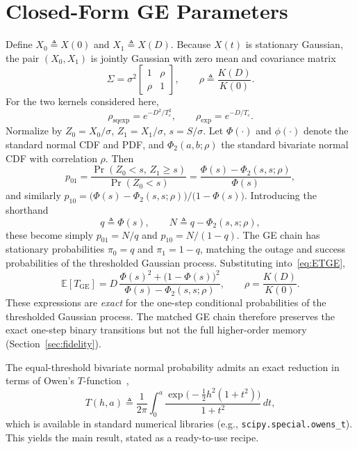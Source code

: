 \documentclass[conference]{IEEEtran}
\newcommand{\ETGE}{\mathbb{E}[T_{\mathrm{GE}}]}
\DeclareMathOperator{\Prob}{Pr}
\begin{document}
\section{Closed-Form GE Parameters}\label{sec:bridge}
Define $X_0\triangleq X(0)$ and $X_1\triangleq X(D)$. Because $X(t)$ is stationary Gaussian, the pair $(X_0,X_1)$ is jointly Gaussian with zero mean and covariance matrix
\begin{equation}\label{eq:sigma}
\Sigma=\sigma^2\begin{bmatrix}1&\rho\\ \rho&1\end{bmatrix},\qquad \rho\triangleq\frac{K(D)}{K(0)}.
\end{equation}
For the two kernels considered here,
\begin{equation}\label{eq:rho}
\rho_{\mathrm{sqexp}}=e^{-D^2/T_c^2},\qquad \rho_{\exp}=e^{-D/T_c}.
\end{equation}
Normalize by $Z_0=X_0/\sigma$, $Z_1=X_1/\sigma$, $s=S/\sigma$. Let $\Phi(\cdot)$ and $\phi(\cdot)$ denote the standard normal CDF and PDF, and $\Phi_2(a,b;\rho)$ the standard bivariate normal CDF with correlation $\rho$. Then
\begin{equation}\label{eq:p01gen}
p_{01}=\frac{\Prob(Z_0<s,\,Z_1\ge s)}{\Prob(Z_0<s)}=\frac{\Phi(s)-\Phi_2(s,s;\rho)}{\Phi(s)},
\end{equation}
and similarly $p_{10}=\big(\Phi(s)-\Phi_2(s,s;\rho)\big)/\big(1-\Phi(s)\big)$. Introducing the shorthand
\begin{equation}\label{eq:qN}
q\triangleq\Phi(s),\qquad N\triangleq q-\Phi_2(s,s;\rho),
\end{equation}
these become simply $p_{01}=N/q$ and $p_{10}=N/(1-q)$. The GE chain has stationary probabilities $\pi_0=q$ and $\pi_1=1-q$, matching the outage and success probabilities of the thresholded Gaussian process. Substituting into~\eqref{eq:ETGE},
\begin{equation}\label{eq:ETGEclosed}
\ETGE=D\,\frac{\Phi(s)^2+\big(1-\Phi(s)\big)^2}{\Phi(s)-\Phi_2(s,s;\rho)},\qquad \rho=\frac{K(D)}{K(0)}.
\end{equation}
These expressions are \emph{exact} for the one-step conditional probabilities of the thresholded Gaussian process. The matched GE chain therefore preserves the exact one-step binary transitions but not the full higher-order memory (Section~\ref{sec:fidelity}).

The equal-threshold bivariate normal probability admits an exact reduction in terms of Owen's $T$-function~\cite{owen1956},
\begin{equation}\label{eq:owenT}
T(h,a)\triangleq\frac{1}{2\pi}\int_0^a\frac{\exp\!\big(-\tfrac12h^2(1+t^2)\big)}{1+t^2}\,dt,
\end{equation}
which is available in standard numerical libraries (e.g., \texttt{scipy.special.owens\_t}). This yields the main result, stated as a ready-to-use recipe.
\end{document}
